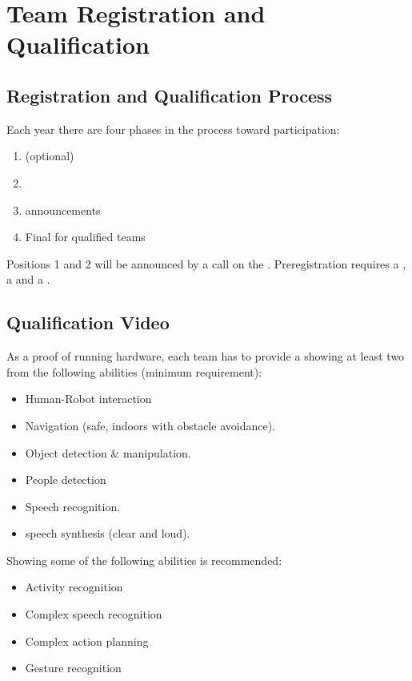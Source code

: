 \section{Team Registration and Qualification}


\subsection{Registration and Qualification Process}
\label{rule:participation}

Each year there are four phases in the process toward participation:
\begin{enumerate}
	\item {} (optional)
	\item {}
	\item {} announcements
	\item Final  for qualified teams
\end{enumerate}
Positions 1 and 2 will be announced by a call on the . Preregistration requires a , a  and a .

\subsection{Qualification Video}
As a proof of running hardware, each team has to provide a  showing at least two from the following abilities (minimum requirement):
\begin{itemize}
	\item Human-Robot interaction
	\item Navigation (safe, indoors with obstacle avoidance).
	\item Object detection \& manipulation.
	\item People detection
	\item Speech recognition.
	\item speech synthesis (clear and loud).
\end{itemize}

Showing some of the following abilities is recommended:
\begin{itemize}
	\item Activity recognition
	\item Complex speech recognition
	\item Complex action planning
	\item Gesture recognition
\end{itemize}


